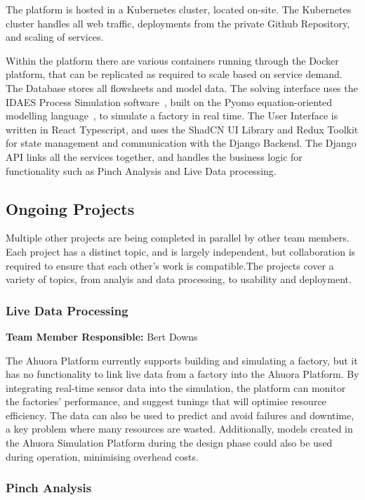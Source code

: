 The platform is hosted in a Kubernetes cluster, located on-site. The Kubernetes cluster handles all web traffic, deployments from the private Github Repository, and scaling of services. 

Within the platform there are various containers running through the Docker platform, that can be replicated as required to scale based on service demand. The Database stores all flowsheets and model data. The solving interface uses the IDAES Process Simulation software~\cite{lee2021idaes}, built on the Pyomo equation-oriented modelling language~\cite{bynum2021pyomo}, to simulate a factory in real time. The User Interface is written in React Typescript, and uses the ShadCN UI Library and Redux Toolkit for state management and communication with the Django Backend. The Django API links all the services together, and handles the business logic for functionality such as Pinch Analysis and Live Data processing.

\subsection{Ongoing Projects}

Multiple other projects are being completed in parallel by other team members. Each project has a distinct topic, and is largely independent, but collaboration is required to ensure that each other's work is compatible.The projects cover a variety of topics, from analyis and data processing, to usability and deployment.

\subsubsection{Live Data Processing}

\textbf{Team Member Responsible:} Bert Downs

\noindent The Ahuora Platform currently supports building and simulating a factory, but it has no functionality to link live data from a factory into the Ahuora Platform. By integrating real-time sensor data into the simulation, the platform can monitor the factories' performance, and suggest tunings that will optimise resource efficiency. The data can also be used to predict and avoid failures and downtime, a key problem where many resources are wasted. Additionally, models created in the Ahuora Simulation Platform during the design phase could also be used during operation, minimising overhead costs.

\subsubsection{Pinch Analysis}


